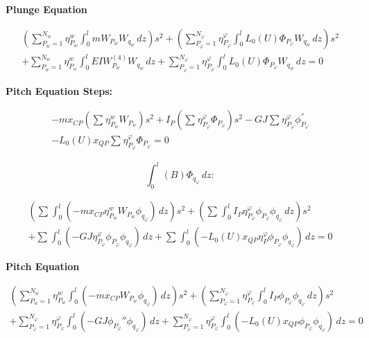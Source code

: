 \documentclass[11pt]{article}
\begin{document}
\textbf{Plunge Equation}

\begin{multline}
\left(
  \sum_{P_{w} = 1}^{N_{w}}
    \eta_{P_{w}}^{w}\int_{0}^{l}{mW_{P_{w}}W_{q_{w}}\,dz}
\right)s^{2}
+
\left(
  \sum_{P_{\varphi}=1}^{N_{\varphi}}
    \eta_{P_{\varphi}}^{\varphi}\int_{0}^{l}{L_{0}(U)\Phi_{P_{\varphi}}W_{q_{w}}\,dz}
\right)s^{2}
\\
+
\sum_{P_{w} = 1}^{N_{w}}
  \eta_{P_{w}}^{w}\int_{0}^{l}{EIW_{P_{w}}^{(4)}W_{q_{w}}\,dz}
+
\sum_{P_{\varphi} = 1}^{N_{\varphi}}
  \eta_{P_{\varphi}}^{\varphi}\int_{0}^{l}{L_{0}(U)\Phi_{P_{\varphi}}W_{q_{w}}\,dz}
= 0
\end{multline}

\textbf{Pitch Equation Steps:}

\begin{multline}
- m x_{CP}\left( \sum_{}^{}{\eta_{P_{w}}^{w}W_{P_{w}}} \right)s^{2}
+ I_{P}\left( \sum_{}^{}{\eta_{P_{\varphi}}^{\varphi}\Phi_{P_{\varphi}}} \right)s^{2}
- GJ\sum_{}^{}{\eta_{P_{\varphi}}^{\varphi}\phi_{P_{\varphi}}^{''}}
\\
- L_{0}(U) x_{QP}\sum_{}^{}\eta_{P_{\varphi}}^{\varphi}\Phi_{P_{\varphi}} = 0
\end{multline}

\[
\int_{0}^{l}{(B)\Phi_{q_{\varphi}}\,dz:}
\]

\begin{multline}
\left(
  \sum_{}^{}\int_{0}^{l}
  \left( - m x_{CP}\eta_{P_{w}}^{w}W_{P_{w}}\phi_{q_{\varphi}} \right)\,dz
\right)s^{2}
+
\left(
  \sum_{}^{}\int_{0}^{l}
    I_{P}\eta_{P_{\varphi}}^{\varphi}\phi_{P_{\varphi}}\phi_{q_{\varphi}}\,dz
\right)s^{2}
\\
+
\sum_{}^{}\int_{0}^{l}
  \left( - GJ\eta_{P_{\varphi}}^{\varphi}\phi_{P_{\varphi}}\phi_{q_{\varphi}} \right)\,dz
+
\sum_{}^{}\int_{0}^{l}
  \left( - L_{0}(U)x_{QP}\eta_{P}^{\varphi}\phi_{P_{\varphi}}\phi_{q_{\varphi}} \right)\,dz
= 0
\end{multline}

\textbf{Pitch Equation}

\begin{multline}
\left(
  \sum_{P_{w} = 1}^{N_{w}}
    \eta_{P_{w}}^{w}\int_{0}^{l}{\left( - m x_{CP}W_{P_{w}}\phi_{q_{\varphi}} \right)\,dz}
\right)s^{2}
+
\left(
  \sum_{P_{\varphi} = 1}^{N_{\varphi}}
    \eta_{P_{\varphi}}^{\varphi}\int_{0}^{l}{I_{P}\phi_{P_{\varphi}}\phi_{q_{\varphi}}\,dz}
\right)s^{2}
\\
+
\sum_{P_{\varphi} = 1}^{N_{\varphi}}
  \eta_{P_{\varphi}}^{\varphi}\int_{0}^{l}{\left( - GJ\phi_{P_{\varphi}}''\phi_{q_{\varphi}} \right)\,dz}
+
\sum_{P_{\varphi} = 1}^{N_{\varphi}}
  \eta_{P_{\varphi}}^{\varphi}\int_{0}^{l}{\left( - L_{0}(U)x_{QP}\phi_{P_{\varphi}}\phi_{q_{\varphi}} \right)\,dz}
= 0
\end{multline}
\end{document}
